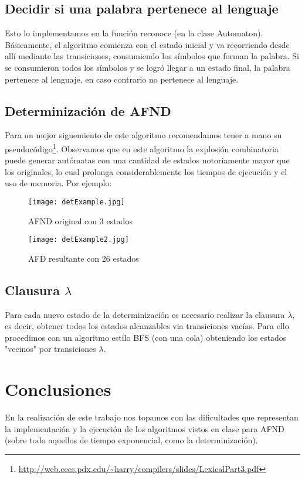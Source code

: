 \documentclass[a4paper]{article}
\begin{document}
\subsection{Decidir si una palabra pertenece al lenguaje}
Esto lo implementamos en la función reconoce (en la clase Automaton).
Básicamente, el algoritmo comienza con el estado inicial y va recorriendo desde allí mediante las transiciones, consumiendo los símbolos que forman la palabra. Si se consumieron todos los símbolos y se logró llegar a un estado final, la palabra pertenece al lenguaje, en caso contrario no pertenece al lenguaje.  

\subsection{Determinización de AFND}
Para un mejor siguemiento de este algoritmo recomendamos tener a mano su pseudocódigo\footnote{ \url{http://web.cecs.pdx.edu/~harry/compilers/slides/LexicalPart3.pdf}}.
Observamos que en este algoritmo la explosión combinatoria puede generar autómatas con una cantidad de estados notoriamente mayor que los originales, lo cual prolonga considerablemente los tiempos de ejecución y el uso de memoria. Por ejemplo:

\begin{figure}[H]
\centering
\texttt{[image: detExample.jpg]}
\caption{AFND original con 3 estados}
\end{figure}


\begin{figure}[H]
\centering
\texttt{[image: detExample2.jpg]}
\caption{AFD resultante con 26 estados}
\end{figure}

\subsection{Clausura $\lambda$}
Para cada nuevo estado de la determinización es necesario realizar la clausura $\lambda$, es decir, obtener todos los estados alcanzables via transiciones vacías. Para ello procedimos con un algoritmo estilo BFS (con una cola) obteniendo los estados "vecinos" por transiciones $\lambda$.
\section{Conclusiones}
En la realización de este trabajo nos topamos con las dificultades que representan la implementación y la ejecución de los algoritmos vistos en clase para AFND (sobre todo aquellos de tiempo exponencial, como la determinización).  
\end{document}
